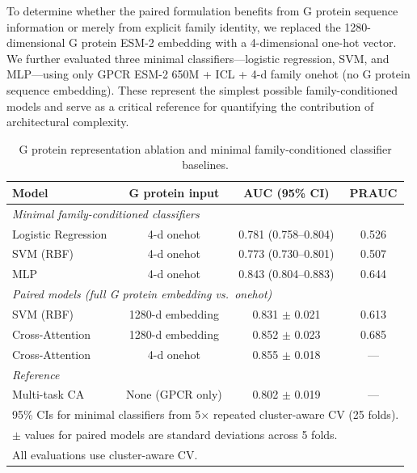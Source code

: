 \documentclass[11pt,a4paper]{article}
\begin{document}
To determine whether the paired formulation benefits from G protein sequence information or merely from explicit family identity, we replaced the 1280-dimensional G protein ESM-2 embedding with a 4-dimensional one-hot vector. We further evaluated three minimal classifiers---logistic regression, SVM, and MLP---using only GPCR ESM-2 650M + ICL + 4-d family onehot (no G protein sequence embedding). These represent the simplest possible family-conditioned models and serve as a critical reference for quantifying the contribution of architectural complexity.

\begin{table}[h!]
\centering
\caption{G protein representation ablation and minimal family-conditioned classifier baselines.}
\label{tab:onehot_ablation}
\begin{tabular}{lccc}
\toprule
Model & G protein input & AUC (95\% CI) & PRAUC \\
\midrule
\multicolumn{4}{l}{\textit{Minimal family-conditioned classifiers}} \\
Logistic Regression & 4-d onehot & 0.781 (0.758--0.804) & 0.526 \\
SVM (RBF)           & 4-d onehot & 0.773 (0.730--0.801) & 0.507 \\
MLP                 & 4-d onehot & 0.843 (0.804--0.883) & 0.644 \\
\midrule
\multicolumn{4}{l}{\textit{Paired models (full G protein embedding vs.\ onehot)}} \\
SVM (RBF)           & 1280-d embedding & 0.831 $\pm$ 0.021 & 0.613 \\
Cross-Attention     & 1280-d embedding & 0.852 $\pm$ 0.023 & 0.685 \\
Cross-Attention     & 4-d onehot        & 0.855 $\pm$ 0.018 & --- \\
\midrule
\multicolumn{4}{l}{\textit{Reference}} \\
Multi-task CA       & None (GPCR only)  & 0.802 $\pm$ 0.019 & --- \\
\bottomrule
\multicolumn{4}{l}{\small 95\% CIs for minimal classifiers from 5$\times$ repeated cluster-aware CV (25 folds).} \\
\multicolumn{4}{l}{\small $\pm$ values for paired models are standard deviations across 5 folds.} \\
\multicolumn{4}{l}{\small All evaluations use cluster-aware CV.} \\
\end{tabular}
\end{table}
\end{document}
